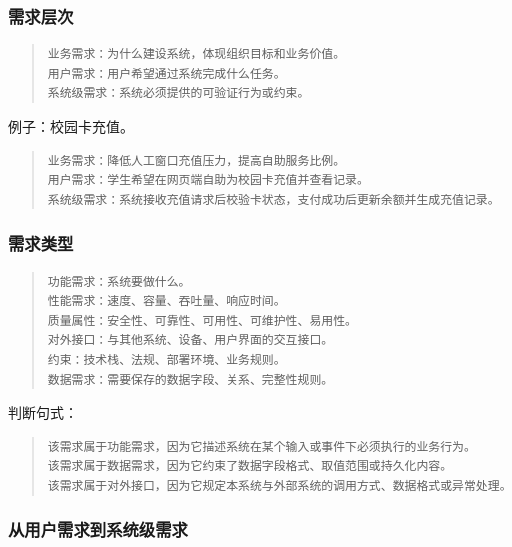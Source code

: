 \documentclass[UTF8,zihao=-4]{ctexart}
\begin{document}
\subsubsection{需求层次}


\begin{quote}
\footnotesize
\begin{verbatim}
业务需求：为什么建设系统，体现组织目标和业务价值。
用户需求：用户希望通过系统完成什么任务。
系统级需求：系统必须提供的可验证行为或约束。
\end{verbatim}
\end{quote}


例子：校园卡充值。


\begin{quote}
\footnotesize
\begin{verbatim}
业务需求：降低人工窗口充值压力，提高自助服务比例。
用户需求：学生希望在网页端自助为校园卡充值并查看记录。
系统级需求：系统接收充值请求后校验卡状态，支付成功后更新余额并生成充值记录。
\end{verbatim}
\end{quote}


\subsubsection{需求类型}


\begin{quote}
\footnotesize
\begin{verbatim}
功能需求：系统要做什么。
性能需求：速度、容量、吞吐量、响应时间。
质量属性：安全性、可靠性、可用性、可维护性、易用性。
对外接口：与其他系统、设备、用户界面的交互接口。
约束：技术栈、法规、部署环境、业务规则。
数据需求：需要保存的数据字段、关系、完整性规则。
\end{verbatim}
\end{quote}


判断句式：


\begin{quote}
\footnotesize
\begin{verbatim}
该需求属于功能需求，因为它描述系统在某个输入或事件下必须执行的业务行为。
该需求属于数据需求，因为它约束了数据字段格式、取值范围或持久化内容。
该需求属于对外接口，因为它规定本系统与外部系统的调用方式、数据格式或异常处理。
\end{verbatim}
\end{quote}


\subsubsection{从用户需求到系统级需求}
\end{document}
